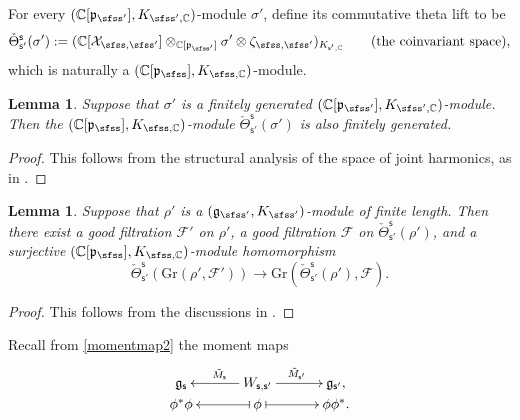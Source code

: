 \documentclass[12pt,a4paper]{amsart}
\newcommand{\CF}{{\mathcal {F}}}
\newcommand{\CX}{{\mathcal {X}}}
\newcommand{\g}{\mathfrak g}
\newcommand{\p}{\mathfrak p}
\numberwithin{equation}{section}
\newtheorem{lem}[thm]{Lemma}
\theoremstyle{remark}
\begin{document}
For every  $(\C[\p_{\sfss'}], K_{\sfss', \C})$-module $\sigma'$, define its commutative theta lift to be
\[
   \check \Theta_{\mathsf s'}^{\mathsf s}(\sigma'):=(\C[\CX_{\sfss, \sfss'}]\otimes_{\C[\p_{\sfss'}]} \sigma'\otimes \zeta_{\sfss, \sfss'})_{K_{\mathsf s', \C}} \qquad (\textrm{the  coinvariant space}),
\]
which is naturally a  $(\C[\p_{\sfss}], K_{\sfss, \C})$-module.

\begin{lem}
Suppose that $\sigma'$ is a finitely generated  $(\C[\p_{\sfss'}], K_{\sfss', \C})$-module. Then the  $(\C[\p_{\sfss}], K_{\sfss, \C})$-module   $\check \Theta_{\mathsf s'}^{\mathsf s}(\sigma')$ is also finitely generated.
\end{lem}
\begin{proof} This follows from the structural analysis of the space of joint harmonics, as in \cite[Section 4]{Howe89}.
\end{proof}

\begin{lem}\label{lm}
Suppose that $\rho'$ is a  $(\g_{\sfss'}, K_{\sfss'})$-module of finite length. Then there exist a good filtration $\CF'$ on $\rho'$, a good filtration $\CF$ on $\check \Theta_{\mathsf s'}^{\mathsf s}(\rho')$, and a surjective $(\C[\p_{\sfss}], K_{\sfss, \C})$-module homomorphism
\[
  \check \Theta_{\mathsf s'}^{\mathsf s}(\mathrm{Gr}(\rho',\CF')) \rightarrow \mathrm{Gr}(\check \Theta_{\mathsf s'}^{\mathsf s}(\rho'),\CF).
\]
\end{lem}
\begin{proof} This follows from the discussions in \cite[Section 3.2]{LM}.
\end{proof}


Recall from \eqref{momentmap2}  the moment maps
\[
    \xymatrix@R=0em@C=3em{
      \g_\mathsf s &\ar[l]_{\tilde M_\mathsf s} W_{\mathsf s, \mathsf s'}\ar[r]^{\tilde M_{\mathsf s'}}& \g_{\mathsf s'},\\
     \phi^* \phi & \ar@{|->}[l] \phi \ar@{|->}[r] & \phi \phi^*.
    }
  \]
\end{document}
